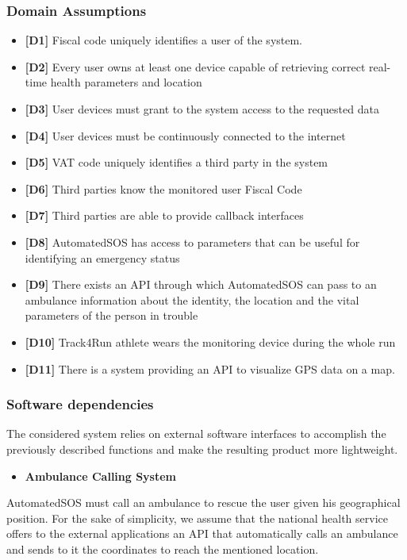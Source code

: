 \subsubsection{Domain Assumptions}
\begin{itemize}
    \item \textbf{[D1]} Fiscal code uniquely identifies a user of the system.
    \item \textbf{[D2]} Every user owns at least one device capable of retrieving correct real-time health parameters and location
    \item \textbf{[D3]} User devices must grant to the system access to the requested data
    \item \textbf{[D4]} User devices must be continuously connected to the internet
    \item \textbf{[D5]} VAT code uniquely identifies a third party in the system
    \item \textbf{[D6]} Third parties know the monitored user Fiscal Code
    \item \textbf{[D7]} Third parties are able to provide callback interfaces
    \item \textbf{[D8]} AutomatedSOS has access to parameters that can be useful for identifying an emergency status
    \item \textbf{[D9]} There exists an API through which AutomatedSOS can pass to an ambulance information about the identity, the location and the vital parameters of the person in trouble
    \item \textbf{[D10]} Track4Run athlete wears the monitoring device during the whole run
    \item \textbf{[D11]} There is a system providing an API to visualize GPS data on a map.
\end{itemize}

\subsubsection{Software dependencies}
The considered system relies on external software interfaces to accomplish the previously described functions and make the resulting product more lightweight.

\begin{itemize}
    \item \textbf{Ambulance Calling System}
\end{itemize}

AutomatedSOS must call an ambulance to rescue the user given his geographical position. For the sake of simplicity, we assume that the national health service offers to the external applications an API that automatically calls an ambulance and sends to it the coordinates to reach the mentioned location.

